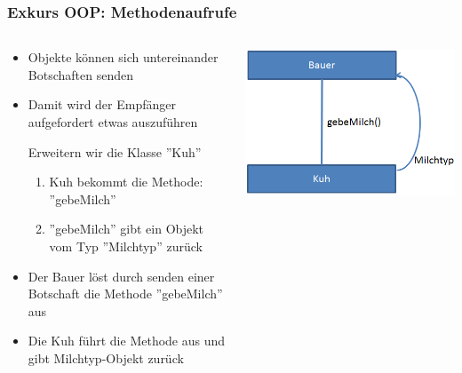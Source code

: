 \begin{frame}
\frametitle{Exkurs OOP: Methodenaufrufe}
\begin{columns}
	    \begin{column}{.6\textwidth}
			\small
			\begin{itemize}
			  \item Objekte k\"onnen sich untereinander Botschaften senden
			  \item Damit wird der Empf\"anger aufgefordert etwas auszuf\"uhren
			  \begin{item}
			  		Erweitern wir die Klasse ''Kuh''
					\begin{enumerate}
					  \item \tiny Kuh bekommt die Methode: ''gebeMilch''
					  \item \tiny ''gebeMilch'' gibt ein Objekt vom Typ ''Milchtyp'' zur\"uck
					\end{enumerate}
			  \end{item}
			  \item Der Bauer l\"ost durch senden einer Botschaft die Methode
			  ''gebeMilch'' aus
			  \item Die Kuh f\"uhrt die Methode aus und gibt Milchtyp-Objekt zur\"uck
			\end{itemize}
			\normalsize
	    \end{column}
	    \begin{column}{.4\textwidth}
	   		\center
			\includegraphics[width=1\textwidth,
			keepaspectratio=true]{bilder/methodenaufruf.png}
	    \end{column}
	\end{columns}
\end{frame}

